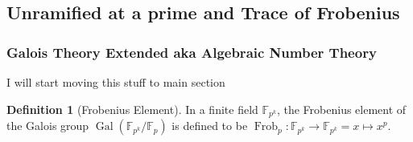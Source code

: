 \documentclass{article}
\theoremstyle{definition}
\newtheorem{definition}{Definition}[section]
\theoremstyle{definition}
\theoremstyle{definition}
\newcommand{\Q}{\mathbb{Q}}
\begin{document}














\subsection{Unramified at a prime and Trace of Frobenius}


\subsubsection{Galois Theory Extended aka Algebraic Number Theory}

I will start moving this stuff to main section 

\begin{definition}[Frobenius Element]
    In a finite field $\mathbb F_{p^k}$, the Frobenius element of the Galois group $\operatorname{Gal}(\mathbb F_{p^k}/\mathbb F_p)$ is defined to be $\operatorname{Frob}_p:\mathbb F_{p^k}\rightarrow\mathbb F_{p^k}=x\mapsto x^p$.
\end{definition}
\end{document}
